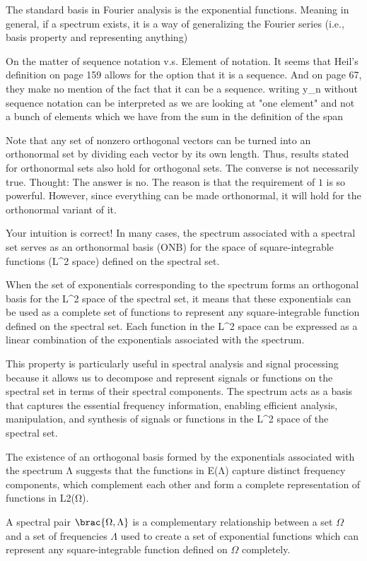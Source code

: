 
The standard basis in Fourier analysis is the exponential functions. 
Meaning in general, if a spectrum exists, it is a way of generalizing the Fourier series (i.e., basis property and representing anything)


On the matter of sequence notation v.s. Element of notation. It seems that Heil's definition on page 159 allows for the option that it is a sequence. And on page 67, they make no mention of the fact that it can be a sequence.
writing y_n without sequence notation can be interpreted as we are looking at "one element" and not a bunch of elements which we have from the sum in the definition of the span


Note that any set of nonzero orthogonal vectors can be turned into an orthonormal set by dividing each vector by its own length. 
Thus, results stated for orthonormal sets also hold for orthogonal sets. The converse is not necessarily true.
Thought: The answer is no. The reason is that the requirement of $1$ is so powerful. However, since everything can be made orthonormal, it will hold for the orthonormal variant of it. 



Your intuition is correct! In many cases, the spectrum associated with a spectral set serves as an orthonormal basis (ONB) for the space of square-integrable functions (L^2 space) defined on the spectral set.

When the set of exponentials corresponding to the spectrum forms an orthogonal basis for the L^2 space of the spectral set, it means that these exponentials can be used as a complete set of functions to represent any square-integrable function defined on the spectral set. Each function in the L^2 space can be expressed as a linear combination of the exponentials associated with the spectrum.

This property is particularly useful in spectral analysis and signal processing because it allows us to decompose and represent signals or functions on the spectral set in terms of their spectral components. The spectrum acts as a basis that captures the essential frequency information, enabling efficient analysis, manipulation, and synthesis of signals or functions in the L^2 space of the spectral set.

The existence of an orthogonal basis formed by the exponentials associated with the spectrum Λ suggests that the functions in E(Λ) capture distinct frequency components, which complement each other and form a complete representation of functions in L2(Ω).

A spectral pair $\brac{\Omega,\Lambda}$ is a complementary relationship between a set $\Omega$ and a set of frequencies $\Lambda$ used to create a set of exponential functions which can represent any square-integrable function defined on $\Omega$ completely. 